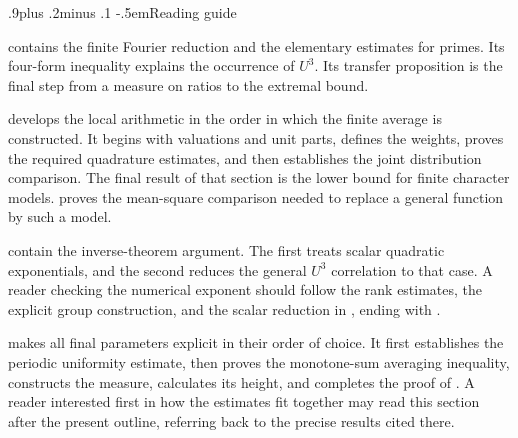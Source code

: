 \documentclass[twoside]{aomart}
\makeatletter
\theoremstyle{paperplain}
\theoremstyle{paperdefinition}
\renewcommand\subsection{\@startsection{subsection}{2}{\z@}
  {.9\baselineskip plus .2\baselineskip minus .1\baselineskip}
  {-.5em}{\normalfont\bfseries}}
\numberwithin{equation}{section}
\makeatother
\begin{document}
\begin{minipage}{\linewidth}
\par\smallskip
\end{minipage}\par\bigskip

\endgroup


\subsection{Reading guide}

 contains the finite Fourier reduction and the
elementary estimates for primes. Its four-form inequality explains
the occurrence of $U^3$. Its transfer proposition is the final
step from a measure on ratios to the extremal bound.

 develops the local arithmetic in the order in
which the finite average is constructed. It begins with valuations
and unit parts, defines the weights, proves the required quadrature
estimates, and then establishes the joint distribution comparison.
The final result of that section is the lower bound for finite
character models.  proves the mean-square
comparison needed to replace a general function by such a model.

 contain the inverse-theorem argument.
The first treats scalar quadratic exponentials, and the second
reduces the general $U^3$ correlation to that case. A reader
checking the numerical exponent should follow the rank estimates,
the explicit group construction, and the scalar reduction in
, ending with .

 makes all final parameters explicit in their
order of choice. It first establishes the periodic uniformity
estimate, then proves the monotone-sum averaging inequality,
constructs the measure, calculates its height, and completes the
proof of . A reader interested first in how the
estimates fit together may read this section after the present
outline, referring back to the precise results cited there.
\end{document}
